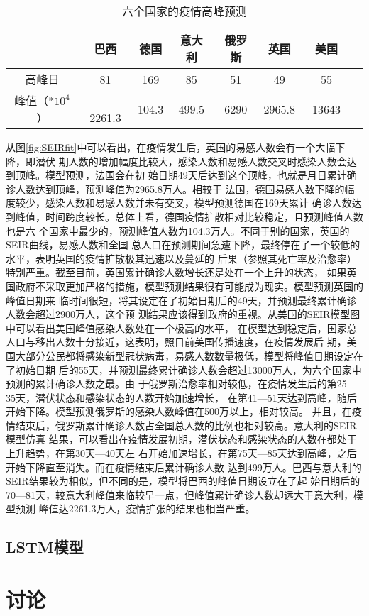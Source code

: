 \documentclass[lang=cn,11pt,a4paper,cite=authoryear]{elegantpaper}
\begin{document}
\begin{table}[htp]
	\centering
	\caption{六个国家的疫情高峰预测}
	\label{table:SEIRprediction}
	\begin{tabular}{cccccccc}
		\hline
		 & 巴西 & 德国 & 意大利 & 俄罗斯 & 英国 & 美国 \\
		\hline
		高峰日 & 81 & 169 & 85 & 51 & 49 & 55 \\
		峰值（*$10^4$） &　2261.3 & 104.3 & 499.5 & 6290 & 2965.8 & 13643　\\
		\hline
	\end{tabular}
\end{table}

从图\ref{fig:SEIRfit}中可以看出，在疫情发生后，英国的易感人数会有一个大幅下降，即潜伏
期人数的增加幅度比较大，感染人数和易感人数交叉时感染人数会达到顶峰。模型预测，法国会在初
始日期49天后达到这个顶峰，也就是月日累计确诊人数达到顶峰，预测峰值为2965.8万人。相较于
法国，德国易感人数下降的幅度较少，感染人数和易感人数并未有交叉，模型预测德国在169天累计
确诊人数达到峰值，时间跨度较长。总体上看，德国疫情扩散相对比较稳定，且预测峰值人数也是六
个国家中最少的，预测峰值人数为104.3万人。不同于别的国家，英国的SEIR曲线，易感人数和全国
总人口在预测期间急速下降，最终停在了一个较低的水平，表明英国的疫情扩散极其迅速以及蔓延的
后果（参照其死亡率及治愈率）特别严重。截至目前，英国累计确诊人数增长还是处在一个上升的状态，
如果英国政府不采取更加严格的措施，模型预测结果很有可能成为现实。模型预测英国的峰值日期来
临时间很短，将其设定在了初始日期后的49天，并预测最终累计确诊人数会超过2900万人，这个预
测结果应该得到政府的重视。从美国的SEIR模型图中可以看出美国峰值感染人数处在一个极高的水平，
在模型达到稳定后，国家总人口与移出人数十分接近，这表明，照目前美国传播速度，在疫情发展后
期，美国大部分公民都将感染新型冠状病毒，易感人数数量极低，模型将峰值日期设定在了初始日期
后的55天，并预测最终累计确诊人数会超过13000万人，为六个国家中预测的累计确诊人数之最。由
于俄罗斯治愈率相对较低，在疫情发生后的第25—35天，潜伏状态和感染状态的人数开始加速增长，
在第41—51天达到高峰，随后开始下降。模型预测俄罗斯的感染人数峰值在500万以上，相对较高。
并且，在疫情结束后，俄罗斯累计确诊人数占全国总人数的比例也相对较高。意大利的SEIR模型仿真
结果，可以看出在疫情发展初期，潜伏状态和感染状态的人数在都处于上升趋势，在第30天—40天左
右开始加速增长，在第75天—85天达到高峰，之后开始下降直至消失。而在疫情结束后累计确诊人数
达到499万人。巴西与意大利的SEIR结果较为相似，但不同的是，模型将巴西的峰值日期设立在了起
始日期后的70—81天，较意大利峰值来临较早一点，但峰值累计确诊人数却远大于意大利，模型预测
峰值达2261.3万人，疫情扩张的结果也相当严重。

\subsection{LSTM模型}

\section{讨论}


\end{document}
